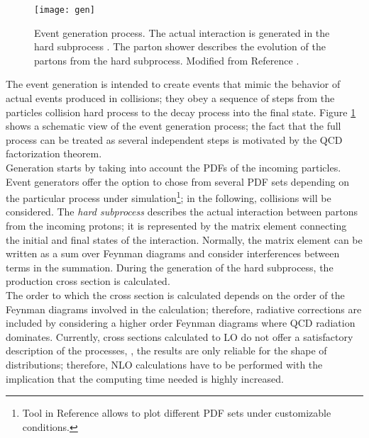 \begin{figure}[!h]
  \centering
  \texttt{[image: gen]}
  \caption[Event generation process.]{Event generation process. %
    The actual interaction is generated in the hard subprocess%
    . The parton shower describes the evolution of the partons from the hard subprocess.%
     Modified from Reference \cite{gen_scheme}.}\label{fig:gen}
\end{figure}

\noindent The event generation is intended to create events that mimic the behavior of actual events produced in collisions; they obey a sequence of steps from the particles collision hard process to the decay process into the final state. Figure \ref{fig:gen} shows a schematic view of the event generation process; the fact that the full process can be treated as several independent steps is motivated by the QCD factorization theorem.\\     

\noindent Generation starts by taking into account the PDFs of the incoming particles. Event generators offer the option to chose from several PDF sets depending on the particular process under simulation\footnote{Tool in Reference \cite{pdfplot} allows to plot different PDF sets under customizable conditions.}; in the following, \pp collisions will be considered. The \textit{hard subprocess} describes the actual interaction between partons from the incoming protons; it is represented by the matrix element connecting the initial and final states of the interaction. Normally, the matrix element can be written as a sum over Feynman diagrams and consider interferences between terms in the summation. During the generation of the hard subprocess, the production cross section is calculated.\\ 

\noindent The order to which the cross section is calculated depends on the order of the Feynman diagrams involved in the calculation; therefore, radiative corrections are included by considering a higher order Feynman diagrams where QCD radiation dominates. Currently, cross sections calculated to LO do not offer a satisfactory description of the processes, \ie, the results are only reliable for the shape of distributions; therefore, NLO calculations have to be performed with the implication that the computing time needed is highly increased.\\       

